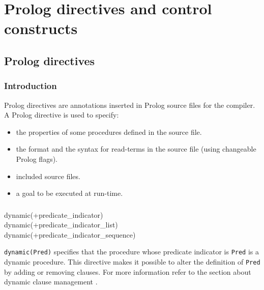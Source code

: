 \newpage
\section{Prolog directives and control constructs}
\subsection{Prolog directives}

\subsubsection{Introduction}
Prolog directives are annotations inserted in Prolog source files for the
compiler. A Prolog directive is used to specify:

\begin{itemize}

\item the properties of some procedures defined in the source file.

\item the format and the syntax for read-terms in the source file (using
changeable Prolog flags).

\item included source files.

\item a goal to be executed at run-time.

\end{itemize}

\subsubsection{ \label{dynamic/1}}

\begin{TemplatesOneCol}
dynamic(+predicate\_indicator)\\
dynamic(+predicate\_indicator\_list)\\
dynamic(+predicate\_indicator\_sequence)

\end{TemplatesOneCol}

\Description

\texttt{dynamic(Pred)} specifies that the procedure whose
predicate indicator is \texttt{Pred} is a dynamic procedure. This directive
makes it possible to alter the definition of \texttt{Pred} by adding or
removing clauses. For more information refer to the section about dynamic
clause management .

